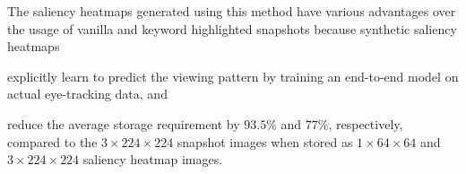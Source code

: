 The saliency heatmaps generated using this method have various advantages over the usage of vanilla and keyword highlighted snapshots because synthetic saliency heatmaps
\begin{inparaenum}[(i)]
\item explicitly learn to predict the viewing pattern by training an end-to-end model on actual eye-tracking data, and 
\item reduce the average storage requirement by $93.5\%$ and $77\%$, respectively, compared to the $3\times224\times224$ snapshot images when stored as $1\times64\times64$ and $3\times224\times224$ saliency heatmap images.
\end{inparaenum}
